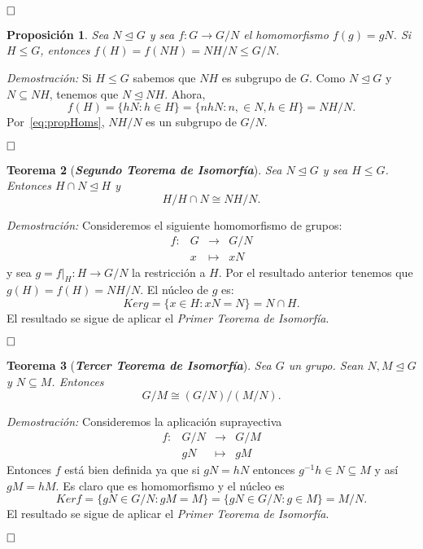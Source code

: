 \documentclass[12pt]{article}
\newtheorem{theorem}{Teorema}[section]
\newtheorem{proposition}[theorem]{Proposición}
\begin{document}
$\hfill \square$

\begin{proposition}\label{eq:lemIsom} Sea $N \unlhd G$ y sea $f \colon G \longrightarrow G/N$ el homomorfismo $f(g) = gN$. Si $H \leq G$, entonces $f(H) = f(NH)=NH/N \leq G/N$.
\end{proposition}
\emph{Demostración: }Si $H \leq G$ sabemos que $NH$ es subgrupo de $G$. Como $N \unlhd G$ y $N \subseteq NH$, tenemos que $N \unlhd NH$. Ahora, $$f(H) = \lbrace hN : h \in H \rbrace = \lbrace nhN :n, \in N, h \in H \rbrace = NH/N.$$ Por~\ref{eq:propHoms}, $NH/N$ es un subgrupo de $G/N$.

$\hfill \square$

\begin{theorem}[\textbf{\textit{Segundo Teorema de Isomorfía}}]
Sea $N \unlhd G$ y sea $H \leq G$. Entonces $H \cap N \unlhd H$ y $$H/H\cap N \cong NH/N.$$

\end{theorem}
\emph{Demostración: }Consideremos el siguiente homomorfismo de grupos: $$\begin{array}{rccl}
f\colon &G&\longrightarrow &G/N \\
&x& \longmapsto &xN
\end{array}
$$
y sea $g = \left.f \right|_H \colon H \longrightarrow G/N$ la restricción a $H$. Por el resultado anterior tenemos que $g(H) = f(H) = NH/N$. El núcleo de $g$ es:
$$Ker g = \lbrace x \in H :xN = N \rbrace = N \cap H.$$ El resultado se sigue de aplicar el \textit{Primer Teorema de Isomorfía}.

$\hfill \square$

\begin{theorem}[\textbf{\textit{Tercer Teorema de Isomorfía}}]
Sea $G$ un grupo. Sean $N,M \unlhd G$ y $N \subseteq M$. Entonces $$G/M \cong (G/N)/(M/N).$$
\end{theorem}
\emph{Demostración: }Consideremos la aplicación suprayectiva $$\begin{array}{rccl}
f \colon &G/N&\longrightarrow &G/M\\
&gN& \longmapsto &gM
\end{array}
$$
Entonces $f$ está bien definida ya que si $gN = hN$ entonces $g^{-1}h \in N \subseteq M$ y así $gM =hM$. Es claro que es homomorfismo y el núcleo es $$Ker f = \lbrace gN \in G/N : gM = M \rbrace = \lbrace gN \in G/N : g \in M \rbrace = M/N.$$
El resultado se sigue de aplicar el \textit{Primer Teorema de Isomorfía}.

$\hfill \square$
\end{document}
